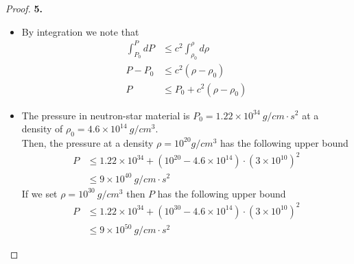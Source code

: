 \documentclass[11pt]{article}
\newcommand{\sci}[1]{\times 10^{#1}}
\theoremstyle{definition}
\begin{document}
\cleardoublepage
\begin{proof}{\textbf{5.}}
\begin{itemize}
\item [(a)] By integration we note that
\begin{align*}
    \int_{P_0}^P  dP &\leq c^2\int_{\rho_0}^\rho d\rho\\
    P - P_0 &\leq c^2 (\rho - \rho_0)\\
    P &\leq P_0 + c^2 (\rho - \rho_0)
\end{align*}

\item [(b)] The pressure in neutron-star material is
$P_0 = 1.22\sci{34}~g/cm \cdot s^2$ at a density of
$\rho_0 = 4.6\sci{14}~g/cm^3$.\\
Then, the pressure at a density $\rho = 10^{20} g/cm^3$ has the following
upper bound
\begin{align*}
    P &\leq 1.22\sci{34} + (10^{20} - 4.6\sci{14})\cdot (3\sci{10})^2\\
    &\leq 9\sci{40}~g/cm \cdot s^2
\end{align*}
If we set $\rho = 10^{30}~g/cm^3$ then $P$ has the following upper bound
\begin{align*}
    P &\leq 1.22\sci{34} + (10^{30} - 4.6\sci{14})\cdot (3\sci{10})^2\\
    &\leq 9\sci{50}~g/cm \cdot s^2
\end{align*}
\end{itemize}
\end{proof}
\end{document}
